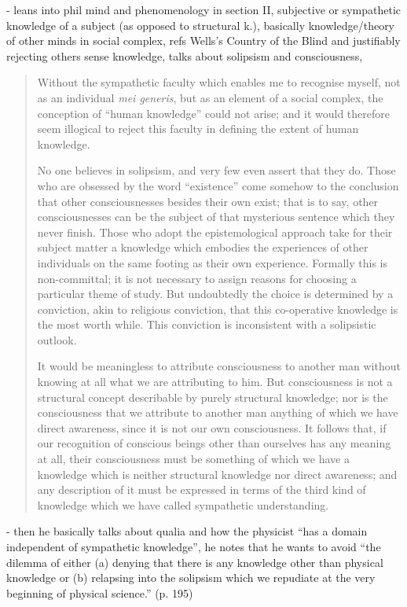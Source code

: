 - leans into phil mind and phenomenology in section II, subjective or sympathetic knowledge of a subject (as opposed to structural k.), basically knowledge/theory of other minds in social complex, refs Wells's Country of the Blind and justifiably rejecting others sense knowledge, talks about solipsism and consciousness, 



\begin{quote}
    Without the sympathetic faculty which enables me to recognise myself, not as an individual \emph{mei generis}, but as an element of a social complex, the conception of ``human knowledge'' could not arise; and it would therefore seem illogical to reject this faculty in defining the extent of human knowledge.  

    No one believes in solipsism, and very few even assert that they do.  Those who are obsessed by the word ``existence'' come somehow to the conclusion that other consciousnesses besides their own exist; that is to say, other consciousnesses can be the subject of that mysterious sentence which they never finish.  Those who adopt the epistemological approach take for their subject matter a knowledge which embodies the experiences of other individuals on the same footing as their own experience.  Formally this is non-committal; it is not necessary to assign reasons for choosing a particular theme of study.  But undoubtedly the choice is determined by a conviction, akin to religious conviction, that this co-operative knowledge is the most worth while.  This conviction is inconsistent with a solipsistic outlook.

    It would be meaningless to attribute consciousness to another man without knowing at all what we are attributing to him. But consciousness is not a structural concept describable by purely structural knowledge; nor is the consciousness that we attribute to another man anything of which we have direct awareness, since it is not our own consciousness.  It follows that, if our recognition of conscious beings other than ourselves has any meaning at all, their consciousness must be something of which we have a knowledge which is neither structural knowledge nor direct awareness; and any description of it must be expressed in terms of the third kind of knowledge which we have called sympathetic understanding.  \citep[p. 193-194]{Eddington1939}
\end{quote}

- then he basically talks about qualia and how the physicist ``has a domain independent of sympathetic knowledge'', he notes that he wants to avoid  ``the dilemma of either  (a) denying that there is any knowledge other than physical knowledge or (b) relapsing into the solipsism which we repudiate at the very beginning of physical science.'' (p. 195)

